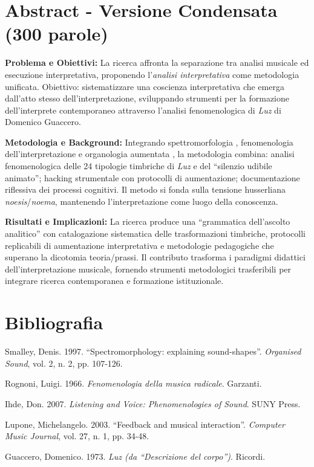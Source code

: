 \documentclass[12pt,a4paper]{article}
\begin{document}
\vspace{1cm}

\clearpage

\section*{Abstract - Versione Condensata (300 parole)}

\textbf{Problema e Obiettivi:} La ricerca affronta la separazione tra analisi musicale ed esecuzione interpretativa, proponendo l'\textit{analisi interpretativa} come metodologia unificata. Obiettivo: sistematizzare una coscienza interpretativa che emerga dall'atto stesso dell'interpretazione, sviluppando strumenti per la formazione dell'interprete contemporaneo attraverso l'analisi fenomenologica di \textit{Luz} di Domenico Guaccero.

\textbf{Metodologia e Background:} Integrando spettromorfologia \cite{smalley1997spectromorphology}, fenomenologia dell'interpretazione \cite{rognoni1966fenomenologia, ihde2007listening} e organologia aumentata \cite{lupone2003feedback}, la metodologia combina: analisi fenomenologica delle 24 tipologie timbriche di \textit{Luz} e del ``silenzio udibile animato''; hacking strumentale con protocolli di aumentazione; documentazione riflessiva dei processi cognitivi. Il metodo si fonda sulla tensione husserliana \textit{noesis}/\textit{noema}, mantenendo l'interpretazione come luogo della conoscenza.

\textbf{Risultati e Implicazioni:} La ricerca produce una ``grammatica dell'ascolto analitico'' con catalogazione sistematica delle trasformazioni timbriche, protocolli replicabili di aumentazione interpretativa e metodologie pedagogiche che superano la dicotomia teoria/prassi. Il contributo trasforma i paradigmi didattici dell'interpretazione musicale, fornendo strumenti metodologici trasferibili per integrare ricerca contemporanea e formazione istituzionale.

\vspace{1cm}

\clearpage

\section*{Bibliografia}

\begin{enumerate}[label={[\arabic*]}]
    \item Smalley, Denis. 1997. ``Spectromorphology: explaining sound-shapes''. \textit{Organised Sound}, vol. 2, n. 2, pp. 107-126.
    \item Rognoni, Luigi. 1966. \textit{Fenomenologia della musica radicale}. Garzanti.
    \item Ihde, Don. 2007. \textit{Listening and Voice: Phenomenologies of Sound}. SUNY Press.
    \item Lupone, Michelangelo. 2003. ``Feedback and musical interaction''. \textit{Computer Music Journal}, vol. 27, n. 1, pp. 34-48.
    \item Guaccero, Domenico. 1973. \textit{Luz (da ``Descrizione del corpo'')}. Ricordi.
\end{enumerate}
\end{document}
